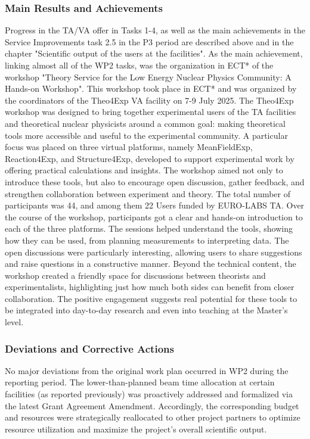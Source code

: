 \subsubsection*{Main Results and Achievements}


Progress in the TA/VA offer in Tasks 1-4, as well as the main achievements in the Service Improvements task 2.5 in the P3 period are described above and in the chapter "Scientific output of the users at the facilities". As the main achievement, linking almost all of the WP2 tasks, was the organization in ECT* of the workshop "Theory Service for the Low Energy Nuclear Physics Community: A Hands-on Workshop". This workshop took place in ECT* and was organized by the coordinators of the Theo4Exp VA facility on 7-9 July 2025.
The Theo4Exp workshop was designed to bring together experimental users of the TA facilities and theoretical nuclear physicists around a common goal: making theoretical tools more accessible and useful to the experimental community. A particular focus was placed on three virtual platforms, namely MeanFieldExp, Reaction4Exp, and Structure4Exp, developed to support experimental work by offering practical calculations and insights. The workshop aimed not only to introduce these tools, but also to encourage open discussion, gather feedback, and strengthen collaboration between experiment and theory. The total number of participants was 44, and among them 22 Users funded by EURO-LABS TA.  Over the course of the workshop, participants got a clear and hands-on introduction to each of the three platforms. The sessions helped understand the tools, showing how they can be used, from planning measurements to interpreting data. The open discussions were particularly interesting, allowing users to share suggestions and raise questions in a constructive manner. Beyond the technical content, the workshop created a friendly space for discussions between theorists and experimentalists, highlighting just how much both sides can benefit from closer collaboration. The positive engagement suggests real potential for these tools to be integrated into day-to-day research and even into teaching at the Master's level.



\subsubsection*{Deviations and Corrective Actions}
\label{sec:wp2-deviations}
No major deviations from the original work plan occurred in WP2 during the reporting period. The lower-than-planned beam time allocation at certain facilities (as reported previously) was proactively addressed and formalized via the latest Grant Agreement Amendment. Accordingly, the corresponding budget and resources were strategically reallocated to other project partners to optimize resource utilization and maximize the project's overall scientific output.
  




